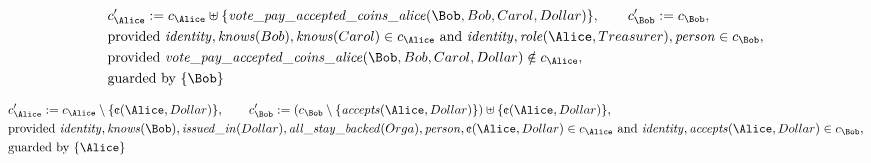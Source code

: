 \begin{align*}
&
c'_
{
\Alice
}
 := 
c_
{
\Alice
}
 \uplus 
\{
\mathit{\detokenize{
vote_pay_accepted_coins_alice
}}
(
\Bob
,
Bob
,
Carol
,
Dollar
)
\}
, \qquad 
c'_
{
\Bob
}
 := 
c_
{
\Bob
}
,\\
&
\text{provided } 
\mathit{\detokenize{
identity
}}
,
\mathit{\detokenize{
knows
}}
(
Bob
)
,
\mathit{\detokenize{
knows
}}
(
Carol
)
 \in c_
{
\Alice
}
 \text{ and } 
\mathit{\detokenize{
identity
}}
,
\mathit{\detokenize{
role
}}
(
\Alice
,
Treasurer
)
,
\mathit{\detokenize{
person
}}
 \in c_
{
\Bob
}
,\\
&
\text{provided } 
\mathit{\detokenize{
vote_pay_accepted_coins_alice
}}
(
\Bob
,
Bob
,
Carol
,
Dollar
)
 \notin c_
{
\Alice
}
,\\
&
\text{guarded by } \{
\Bob
\}
\end{align*}

\begin{align*}
&
c'_
{
\Alice
}
 := 
c_
{
\Alice
}
 \setminus 
\{
\text{\textcent}
(
\Alice
,
Dollar
)
\}
, \qquad 
c'_
{
\Bob
}
 := 
(c_
{
\Bob
}
 \setminus 
\{
\mathit{\detokenize{
accepts
}}
(
\Alice
,
Dollar
)
\}
) \uplus 
\{
\text{\textcent}
(
\Alice
,
Dollar
)
\}
,\\
&
\text{provided } 
\mathit{\detokenize{
identity
}}
,
\mathit{\detokenize{
knows
}}
(
\Bob
)
,
\mathit{\detokenize{
issued_in
}}
(
Dollar
)
,
\mathit{\detokenize{
all_stay_backed
}}
(
Orga
)
,
\mathit{\detokenize{
person
}}
,
\text{\textcent}
(
\Alice
,
Dollar
)
 \in c_
{
\Alice
}
 \text{ and } 
\mathit{\detokenize{
identity
}}
,
\mathit{\detokenize{
accepts
}}
(
\Alice
,
Dollar
)
 \in c_
{
\Bob
}
,\\
&
\text{guarded by } \{
\Alice
\}
\end{align*}

